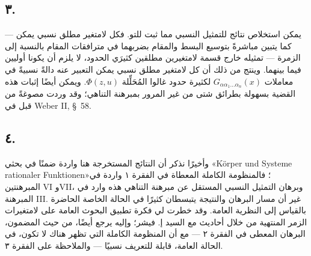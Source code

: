 \documentclass[11pt]{article}
\begin{document}
\subsection*{٣.}
يمكن استخلاص نتائج للتمثيل النسبي مما ثبت للتو. فكل لامتغير مطلق نسبي يمكن --- كما يتبين مباشرةً بتوسيع البسط والمقام بضربهما في مترافقات المقام بالنسبة إلى الزمرة --- تمثيله خارج قسمة لامتغيرين مطلقين كثيرَي الحدود، لا يلزم أن يكونا أوليين فيما بينهما. وينتج من ذلك أن كل لامتغير مطلق نسبي يمكن التعبير عنه دالةً نسبيةً في معاملات $G_{\alpha\alpha_1\ldots\alpha_n}(x)$ لكثيرة حدود غالوا المُحَلِّلة $\Phi(z,u)$. ويمكن أيضًا إثبات هذه القضية بسهولة بطرائق شتى من غير المرور بمبرهنة التناهي؛ وقد وردت مصوغةً من قبل في Weber II, \S\ 58.

\subsection*{٤.}
وأخيرًا نذكر أن النتائج المستخرجة هنا واردة ضمنًا في بحثي «Körper und Systeme rationaler Funktionen»؛ فالمنظومة الكاملة المعطاة في الفقرة ١ واردة في المبرهنتين VI وVII، وبرهان التمثيل النسبي المستقل عن مبرهنة التناهي هذه وارد في المبرهنة III. غير أن مسار البرهان والنتيجة يتبسطان كثيرًا في الحالة الخاصة الحاضرة بالقياس إلى النظرية العامة. وقد خطرت لي فكرة تطبيق البحوث العامة على لامتغيرات الزمر المنتهية من خلال أحاديث مع السيد إ. فيشر؛ وإليه يرجع أيضًا، من حيث المضمون، البرهان المعطى في الفقرة ٢ --- مع أن المنظومة الكاملة التي تظهر هناك لا تكون، في الحالة العامة، قابلة للتعريف نسبيًا --- والملاحظة على الفقرة ٣.
\end{document}
